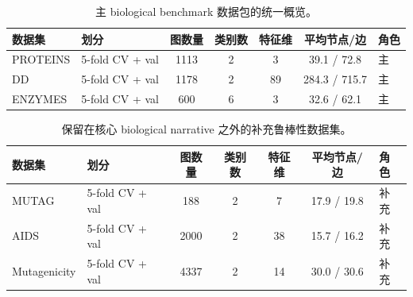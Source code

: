 \begin{table}[!t]
\centering
\small
\caption{主 biological benchmark 数据包的统一概览。}
\label{tab:dataset_main_package}
\setlength{\tabcolsep}{4pt}
\begin{tabular}{l l c c c c l}
\toprule
数据集 & 划分 & 图数量 & 类别数 & 特征维 & 平均节点/边 & 角色 \\
\midrule
PROTEINS & 5-fold CV + val & 1113 & 2 & 3 & 39.1 / 72.8 & 主 \\
DD & 5-fold CV + val & 1178 & 2 & 89 & 284.3 / 715.7 & 主 \\
ENZYMES & 5-fold CV + val & 600 & 6 & 3 & 32.6 / 62.1 & 主 \\
\bottomrule
\end{tabular}
\end{table}

\begin{table}[!t]
\centering
\small
\caption{保留在核心 biological narrative 之外的补充鲁棒性数据集。}
\label{tab:dataset_supp_package}
\setlength{\tabcolsep}{4pt}
\begin{tabular}{l l c c c c l}
\toprule
数据集 & 划分 & 图数量 & 类别数 & 特征维 & 平均节点/边 & 角色 \\
\midrule
MUTAG & 5-fold CV + val & 188 & 2 & 7 & 17.9 / 19.8 & 补充 \\
AIDS & 5-fold CV + val & 2000 & 2 & 38 & 15.7 / 16.2 & 补充 \\
Mutagenicity & 5-fold CV + val & 4337 & 2 & 14 & 30.0 / 30.6 & 补充 \\
\bottomrule
\end{tabular}
\end{table}
